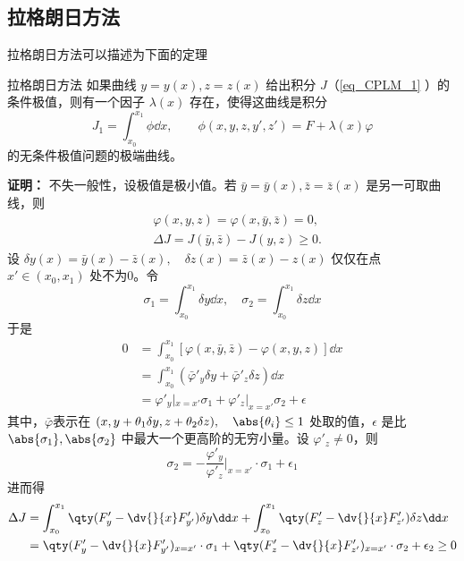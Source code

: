 \subsection{拉格朗日方法}
拉格朗日方法可以描述为下面的定理
\begin{theorem}{拉格朗日方法}
如果曲线 $y=y(x),z=z(x)$ 给出积分 $J$（\autoref{eq_CPLM_1} ）的条件极值，则有一个因子 $\lambda(x)$ 存在，使得这曲线是积分
\begin{equation}\label{eq_CPLM_4}
J_1=\int_{x_0}^{x_1}\phi \dd x,\qquad \phi(x,y,z,y',z')=F+\lambda(x)\varphi
\end{equation}
的无条件极值问题的极端曲线。
\end{theorem}
\textbf{证明：}
不失一般性，设极值是极小值。若 $\bar y=\bar y(x),\bar z=\bar z(x)$ 是另一可取曲线，则
\begin{equation}
\begin{aligned}
&\varphi(x,y,z)=\varphi(x,\bar y,\bar z)=0,\\
&\Delta J=J(\bar y,\bar z)-J(y,z)\geq0.
\end{aligned}
\end{equation}
设 $\delta y(x)=\bar y(x)-\bar z(x),\quad\delta z(x)=\bar z(x)-z(x)$ 仅仅在点 $x'\in (x_0,x_1)$ 处不为0。令
\begin{equation}
\sigma_1=\int_{x_0}^{x_1}\delta y\dd x,\quad \sigma_2=\int_{x_0}^{x_1}\delta z\dd x
\end{equation}
于是
\begin{equation}
\begin{aligned}
0&=\int_{x_0}^{x_1}[\varphi(x,\bar y,\bar z)-\varphi(x,y,z)]\dd x\\
&=\int_{x_0}^{x_1}(\bar\varphi'_y\delta y+\bar\varphi'_z\delta z)\dd x\\
&=\varphi'_y|_{x=x'}\sigma_1+\varphi'_z|_{x=x'}\sigma_2+\epsilon
\end{aligned}
\end{equation}
其中，$\bar\varphi$表示在 $(x,y+\theta_1\delta y,z+\theta_2\delta z),\quad \abs{\theta_i}\leq 1$ 处取的值，$\epsilon$ 是比 $\abs{\sigma_1},\abs{\sigma_2}$ 中最大一个更高阶的无穷小量。设 $\varphi'_z\neq0$，则
\begin{equation}\label{eq_CPLM_2}
\sigma_2=-\frac{\varphi'_y}{\varphi'_z}\Big|_{x=x'}\cdot\sigma_1+\epsilon_1
\end{equation}
进而得
\begin{equation}\label{eq_CPLM_3}
\begin{aligned}
\Delta J&=\int_{x_0}^{x_1}\qty(F'_y-\dv{}{x}F'_{y'})\delta y\dd x+\int_{x_0}^{x_1}\qty(F'_z-\dv{}{x}F'_{z'})\delta z\dd x\\
&=\qty(F'_y-\dv{}{x}F'_{y'})_{x=x'}\cdot\sigma_1+\qty(F'_z-\dv{}{x}F'_{z'})_{x=x'}\cdot\sigma_2+\epsilon_2\geq0
\end{aligned}
\end{equation}
